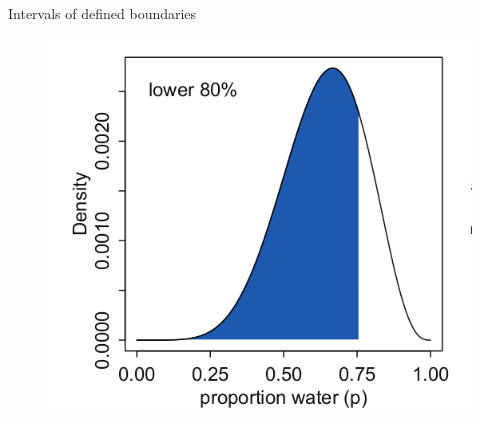 \documentclass[handout]{beamer}
\begin{document}
\begin{frame}{Intervals of defined boundaries}
\scriptsize{

   \begin{figure}[h!]
	\centering
	\includegraphics[scale=0.45]{pics/interval3.png}
	\end{figure} 




} 

\end{frame}
\end{document}
